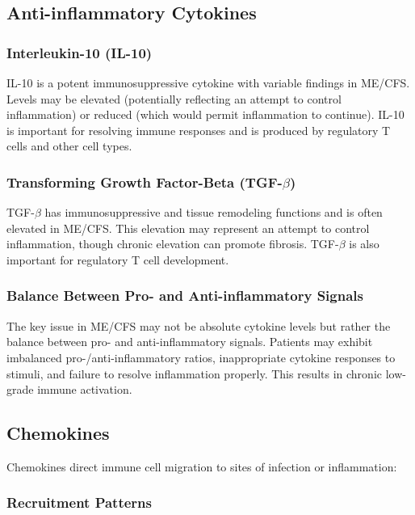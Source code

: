 \subsection{Anti-inflammatory Cytokines}
\label{sec:anti-inflammatory}

\subsubsection{Interleukin-10 (IL-10)}

IL-10 is a potent immunosuppressive cytokine with variable findings in ME/CFS. Levels may be elevated (potentially reflecting an attempt to control inflammation) or reduced (which would permit inflammation to continue). IL-10 is important for resolving immune responses and is produced by regulatory T cells and other cell types.

\subsubsection{Transforming Growth Factor-Beta (TGF-$\beta$)}

TGF-$\beta$ has immunosuppressive and tissue remodeling functions and is often elevated in ME/CFS. This elevation may represent an attempt to control inflammation, though chronic elevation can promote fibrosis. TGF-$\beta$ is also important for regulatory T cell development.

\subsubsection{Balance Between Pro- and Anti-inflammatory Signals}

The key issue in ME/CFS may not be absolute cytokine levels but rather the balance between pro- and anti-inflammatory signals. Patients may exhibit imbalanced pro-/anti-inflammatory ratios, inappropriate cytokine responses to stimuli, and failure to resolve inflammation properly. This results in chronic low-grade immune activation.

\subsection{Chemokines}
\label{sec:chemokines}

Chemokines direct immune cell migration to sites of infection or inflammation:

\subsubsection{Recruitment Patterns}

